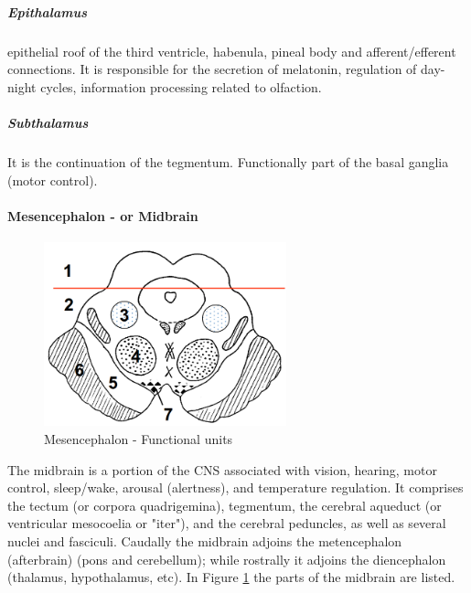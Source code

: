 \documentclass[12pt,article,oneside,a4paper]{memoir}
\begin{document}
\subparagraph{Epithalamus}
epithelial roof of the third ventricle, habenula, pineal body and afferent/efferent connections. It is responsible for the secretion of melatonin, regulation of day-night cycles, information processing related to olfaction.

\subparagraph{Subthalamus}
It is the continuation of the tegmentum. Functionally part of the basal ganglia (motor control).

\newpage

\paragraph{Mesencephalon - or Midbrain}
\begin{figure}
	\centering
  	\includegraphics[width=7cm]{imgs/mesencephalon.png}
	\caption{Mesencephalon - Functional units}
  	\label{fig:mesencephalon}
\end{figure}

The midbrain is a portion of the CNS associated with vision, hearing, motor control, sleep/wake, arousal (alertness), and temperature regulation. It comprises the tectum (or corpora quadrigemina), tegmentum, the cerebral aqueduct (or ventricular mesocoelia or "iter"), and the cerebral peduncles, as well as several nuclei and fasciculi. Caudally the midbrain adjoins the metencephalon (afterbrain) (pons and cerebellum); while rostrally it adjoins the diencephalon (thalamus, hypothalamus, etc). In Figure  \ref{fig:mesencephalon} the parts of the midbrain are listed.
\end{document}

